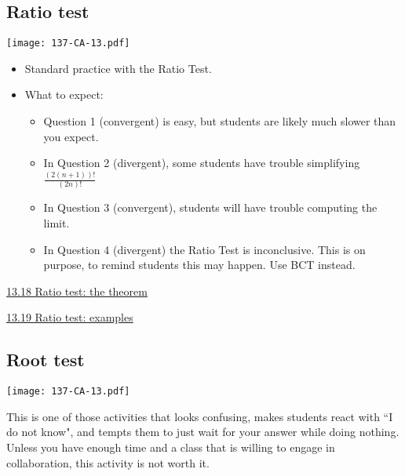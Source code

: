 \documentclass[11pt]{article}
\newcommand {\DS} [1] {${\displaystyle #1}$}
\newcommand{\nl}{\hfill \vspace{-1.1\baselineskip}} %
\newcommand{\vxviii}{\hspace{8mm} \href{https://www.youtube.com/watch?v=2Fj56wxfLEo&list=PLlwePzQY_wW-FJMnD_ybkXU_jZLVtZttI&index=18}{13.18 Ratio test: the theorem} }
\newcommand{\vxix}{\hspace{8mm} \href{https://www.youtube.com/watch?v=S0C0XoEKGCk&list=PLlwePzQY_wW-FJMnD_ybkXU_jZLVtZttI&index=19}{13.19 Ratio test: examples} }
\begin{document}
\newpage
\subsection{Ratio test}

\begin{center}
{ \texttt{[image: 137-CA-13.pdf]}} 
\end{center}

\begin{comments}
\nl
	\begin{itemize}
		\item   Standard practice with the Ratio Test.
		\item What to expect:
			\begin{itemize}
				\item Question 1 (convergent) is easy, but students are likely much slower than you expect.
				\item In Question 2 (divergent), some students have trouble simplifying \DS{\frac{(2(n+1))!}{(2n)!}}
				\item In Question 3 (convergent), students will have trouble computing the limit.
				\item In Question 4 (divergent) the Ratio Test is inconclusive.  This is on purpose, to remind students this may happen.  Use BCT instead.
			\end{itemize}
	\end{itemize}
\end{comments}

\begin{videos}
\vxviii

\vxix
\end{videos}

\newpage
\subsection{Root test}

\begin{center}
{ \texttt{[image: 137-CA-13.pdf]}} 
\end{center}

\begin{warning}
	This is one of those activities that looks confusing, makes students react with ``I do not know", and tempts them to just wait for your answer while doing nothing.  Unless you have enough time and a class that is willing to engage in collaboration, this activity is not worth it.
\end{warning}
\end{document}
